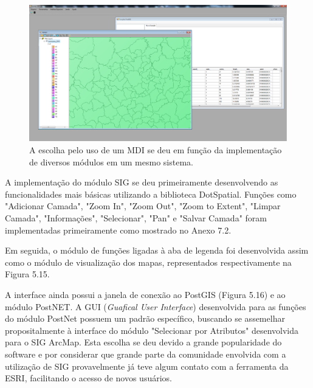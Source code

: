 	\begin{figure}
		\centering
		\includegraphics[width=1\linewidth]{data/mdi_gui}
		\caption{A escolha pelo uso de um MDI se deu em função da implementação de diversos módulos em um mesmo sistema.}
		\label{fig:mdigui}
	\end{figure}

A implementação do módulo SIG se deu primeiramente desenvolvendo as funcionalidades mais básicas utilizando a biblioteca DotSpatial. Funções como "Adicionar Camada", "Zoom In", "Zoom Out", "Zoom to Extent", "Limpar Camada", "Informações", "Selecionar", "Pan" e "Salvar Camada" foram implementadas primeiramente como mostrado no Anexo 7.2.

Em seguida, o módulo de funções ligadas à aba de legenda foi desenvolvida assim como o módulo de visualização dos mapas, representados respectivamente na Figura 5.15.

A interface ainda possui a janela de conexão ao PostGIS (Figura 5.16) e ao módulo PostNET. A GUI (\textit{Guafical User Interface}) desenvolvida para as funções do módulo PostNet possuem um padrão específico, buscando se assemelhar propositalmente à interface do módulo "Selecionar por Atributos" desenvolvida para o SIG ArcMap. Esta escolha se deu devido a grande popularidade do software e por considerar que grande parte da comunidade envolvida com a utilização de SIG provavelmente já teve algum contato com a ferramenta da ESRI, facilitando o acesso de novos usuários.


